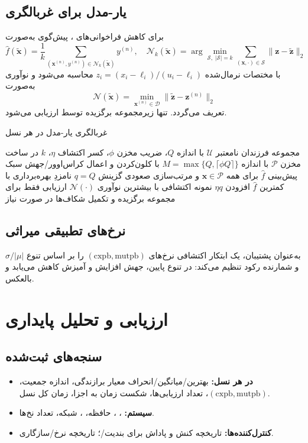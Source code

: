 \subsection{یار-مدل  برای غربالگری}
برای کاهش فراخوانی‌های ، پیش‌گوی  به‌صورت
\begin{equation}
\hat f(\tilde{\mathbf{x}})= \frac{1}{k}\sum_{(\mathbf{x}^{(n)},y^{(n)})\in\mathcal{N}_k(\tilde{\mathbf{x}})} y^{(n)},\quad \mathcal{N}_k(\tilde{\mathbf{x}})=\arg\min_{\mathcal{S},\;|\mathcal{S}|=k}\sum_{(\mathbf{x},\cdot)\in\mathcal{S}}\lVert \mathbf{z}-\tilde{\mathbf{z}}\rVert_2
\end{equation}
با مختصات نرمال‌شده $z_i=(x_i-\ell_i)/(u_i-\ell_i)$ محاسبه می‌شود و نوآوری به‌صورت
\begin{equation}
 \mathcal{N}(\tilde{\mathbf{x}})=\min_{\mathbf{x}^{(n)}\in\mathcal{D}}\lVert \tilde{\mathbf{z}}-\mathbf{z}^{(n)}\rVert_2
\end{equation}
تعریف می‌گردد. تنها زیرمجموعه برگزیده توسط  ارزیابی می‌شود.
\begin{algorithm}[H]
\caption{غربالگری یار-مدل در هر نسل}
\begin{algorithmic}[1]
\REQUIRE مجموعه فرزندان نامعتبر $\mathcal{U}$ با اندازه $Q$، ضریب مخزن $\phi$، کسر اکتشاف $\eta$، $k$ در 
\STATE ساخت مخزن $\mathcal{P}$ با اندازه $M=\max\{Q,\lceil\phi Q\rceil\}$ با کلون‌کردن و اعمال کراس‌اوور/جهش سبک
\STATE پیش‌بینی $\hat f$ برای همه $\mathbf{x}\in\mathcal{P}$ و مرتب‌سازی صعودی
\STATE گزینش $q=Q$ نامزدِ بهره‌برداری با کمترین $\hat f$
\STATE افزودن $\eta q$ نمونه اکتشافی با بیشترین نوآوری $\mathcal{N}(\cdot)$
\STATE ارزیابی  فقط برای مجموعه برگزیده و تکمیل شکاف‌ها در صورت نیاز
\end{algorithmic}
\end{algorithm}

\subsection{نرخ‌های تطبیقی میراثی}
به‌عنوان پشتیبان، یک ابتکار اکتشافی نرخ‌های $(\text{cxpb},\text{mutpb})$ را بر اساس تنوع $\sigma/|\mu|$ و شمارنده رکود تنظیم می‌کند: در تنوع پایین، جهش افزایش و آمیزش کاهش می‌یابد و بالعکس.

\section{ارزیابی و تحلیل پایداری}
\label{sec:benchmarking}
\subsection{سنجه‌های ثبت‌شده}
\begin{itemize}
    \item \textbf{در هر نسل:} بهترین/میانگین/انحراف معیار برازندگی، اندازه جمعیت، $(\text{cxpb},\text{mutpb})$، تعداد ارزیابی‌ها، شکست زمان به اجزا، زمان کل نسل.
    \item \textbf{سیستم:} ، ، حافظه، ، شبکه، تعداد نخ‌ها.
    \item \textbf{کنترل‌کننده‌ها:} تاریخچه کنش و پاداش برای بندیت/؛ تاریخچه نرخ/سازگاری.
\end{itemize}

